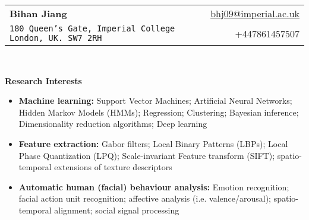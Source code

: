 \documentclass[letterpaper,11pt]{article}
\newcommand{\resheading}[1]{{\large \colorbox{mygrey}{\begin{minipage}{\textwidth}{\textbf{#1 \vphantom{p\^{E}}}}\end{minipage}}}}
\begin{document}
\newcommand{\mywebheader}{
\begin{tabular*}{7in}{l@{\extracolsep{\fill}}r}
	\textbf{{\LARGE Bihan Jiang}} & \href{mailto:bhj09@imperial.ac.uk}{bhj09@imperial.ac.uk}\\
{ \texttt{{180 Queen's Gate, Imperial College London, UK. SW7 2RH}}} & {+447861457507} \\
	\end{tabular*}
\\
\vspace{0.1in}}

\mywebheader

\resheading{Research Interests}
{\small
\begin{itemize}
\item \textbf{Machine learning:} Support Vector Machines; Artificial Neural Networks; Hidden Markov Models (HMMs); Regression; Clustering; Bayesian inference; Dimensionality reduction algorithms; Deep learning 

\item \textbf{Feature extraction:} Gabor filters; Local Binary Patterns (LBPs); Local Phase Quantization (LPQ); Scale-invariant Feature transform (SIFT); spatio-temporal extensions of texture descriptors  
 
\item \textbf{Automatic human (facial) behaviour analysis:} Emotion recognition; facial action unit recognition; affective analysis (i.e. valence/arousal); spatio-temporal alignment; social signal processing 
\end{itemize}
}
\end{document}

